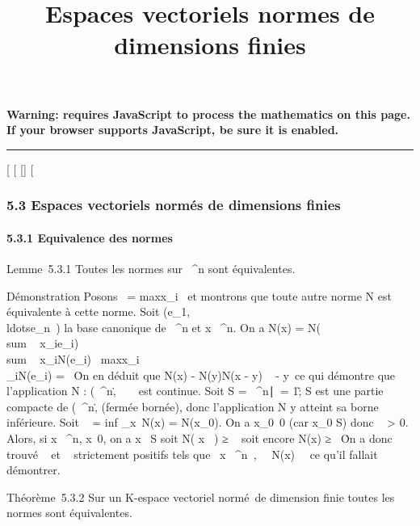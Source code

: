 \documentclass[]{article}
\title{Espaces vectoriels normes de dimensions finies}
\author{}
\date{}
\begin{document}
\maketitle

\textbf{Warning: 
requires JavaScript to process the mathematics on this page.\\ If your
browser supports JavaScript, be sure it is enabled.}

\begin{center}\rule{3in}{0.4pt}\end{center}

[
[
[]
[

\subsubsection{5.3 Espaces vectoriels normés de dimensions finies}

\paragraph{5.3.1 Equivalence des normes}

Lemme~5.3.1 Toutes les normes sur ~^n sont équivalentes.

Démonstration Posons
\x\
= maxx_i~ et
montrons que toute autre norme N est équivalente à cette norme. Soit
(e_1,\\ldotse_n~)
la base canonique de ~^n et x \in {}~^n. On a N(x) =
N(\\sum ~
x_ie_i)
\leq\\sum ~
x_iN(e_i)
\leq\
maxx_i\\\sum
 _iN(e_i) =
\beta~\x\. On en déduit que
N(x) - N(y)\leq N(x - y) \leq \beta~\x
- y\ ce qui démontre que l'application N :
(~^n,\.\) \rightarrow~
~ est continue. Soit S = \x \in
\mathbb{R}~^n∣\x\
= 1\~; S est une partie compacte de
(~^n,\.\)
(fermée bornée), donc l'application N y atteint sa borne inférieure.
Soit \alpha~ = inf _x\inS~N(x) =
N(x_0). On a x_0\neq~0 (car
x_0 \in S) donc \alpha~ > 0. Alors, si x \in \mathbb{R}~^n,
x\neq~0, on a  x \over
\x\ \in S soit N( x
\over
\x\ ) ≥ \alpha~ soit
encore N(x) ≥ \alpha~\x\. On
a donc trouvé \alpha~ et \beta~ strictement positifs tels que
\forall~x \in {}~^n~,
\alpha~\x\ \leq N(x) \leq
\beta~\x\, ce qu'il fallait
démontrer.

Théorème~5.3.2 Sur un K-espace vectoriel normé~de dimension finie toutes
les normes sont équivalentes.
\end{document}
